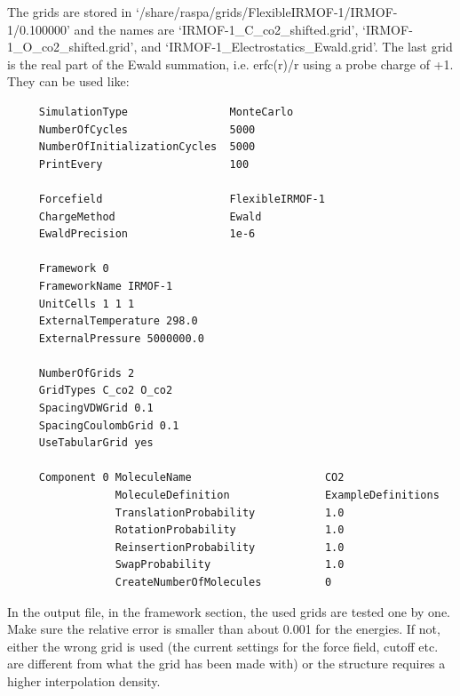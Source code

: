 \noindent The grids are stored in `/share/raspa/grids/FlexibleIRMOF-1/IRMOF-1/0.100000' and the names are
`IRMOF-1\_C\_co2\_shifted.grid', `IRMOF-1\_O\_co2\_shifted.grid', and `IRMOF-1\_Electrostatics\_Ewald.grid'.
The last grid is the real part of the Ewald summation, i.e. erfc(r)/r using a probe charge of +1.
They can be used like:
\begin{tiny}
\begin{verbatim}
     SimulationType                MonteCarlo
     NumberOfCycles                5000
     NumberOfInitializationCycles  5000
     PrintEvery                    100

     Forcefield                    FlexibleIRMOF-1
     ChargeMethod                  Ewald
     EwaldPrecision                1e-6

     Framework 0
     FrameworkName IRMOF-1
     UnitCells 1 1 1
     ExternalTemperature 298.0
     ExternalPressure 5000000.0

     NumberOfGrids 2
     GridTypes C_co2 O_co2
     SpacingVDWGrid 0.1
     SpacingCoulombGrid 0.1
     UseTabularGrid yes

     Component 0 MoleculeName                     CO2
                 MoleculeDefinition               ExampleDefinitions
                 TranslationProbability           1.0
                 RotationProbability              1.0
                 ReinsertionProbability           1.0
                 SwapProbability                  1.0
                 CreateNumberOfMolecules          0
\end{verbatim}
\end{tiny}
In the output file, in the framework section, the used grids are tested one by one.
Make sure the relative error is smaller than about 0.001 for the energies. 
If not, either the wrong grid is used (the current settings for the force field, cutoff etc. are different from what the grid has been made with)
or the structure requires a higher interpolation density.
